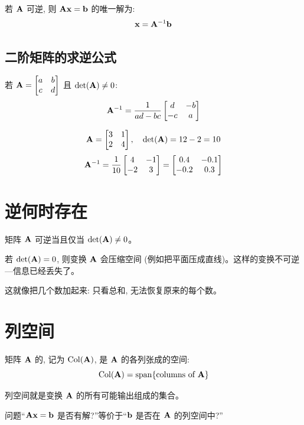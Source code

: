 \begin{theorem}[用逆矩阵解方程组]
若 $\mathbf{A}$ 可逆, 则 $\mathbf{A}\mathbf{x} = \mathbf{b}$ 的唯一解为:
\[
\mathbf{x} = \mathbf{A}^{-1} \mathbf{b}
\]
\end{theorem}

\subsection{二阶矩阵的求逆公式}

\begin{theorem}
若 $\mathbf{A} = \begin{bmatrix} a & b \\ c & d \end{bmatrix}$ 且 $\det(\mathbf{A}) \neq 0$:
\[
\mathbf{A}^{-1} = \frac{1}{ad-bc} \begin{bmatrix} d & -b \\ -c & a \end{bmatrix}
\]
\end{theorem}

\begin{example}
\[
\mathbf{A} = \begin{bmatrix} 3 & 1 \\ 2 & 4 \end{bmatrix}, \quad \det(\mathbf{A}) = 12 - 2 = 10
\]
\[
\mathbf{A}^{-1} = \frac{1}{10} \begin{bmatrix} 4 & -1 \\ -2 & 3 \end{bmatrix} = \begin{bmatrix} 0.4 & -0.1 \\ -0.2 & 0.3 \end{bmatrix}
\]
\end{example}

\section{逆何时存在}

\begin{theorem}
矩阵 $\mathbf{A}$ 可逆当且仅当 $\det(\mathbf{A}) \neq 0$。
\end{theorem}

\begin{intuition}
若 $\det(\mathbf{A}) = 0$, 则变换 $\mathbf{A}$ 会压缩空间 (例如把平面压成直线)。这样的变换不可逆---信息已经丢失了。

这就像把几个数加起来: 只看总和, 无法恢复原来的每个数。
\end{intuition}

\section{列空间}

\begin{definition}[列空间]
矩阵 $\mathbf{A}$ 的, 记为 $\operatorname{Col}(\mathbf{A})$, 是 $\mathbf{A}$ 的各列张成的空间:
\[
\operatorname{Col}(\mathbf{A}) = \operatorname{span}\{\text{columns of } \mathbf{A}\}
\]
\end{definition}

\begin{intuition}
列空间就是变换 $\mathbf{A}$ 的所有可能输出组成的集合。

问题``$\mathbf{A}\mathbf{x} = \mathbf{b}$ 是否有解?''等价于``$\mathbf{b}$ 是否在 $\mathbf{A}$ 的列空间中?''
\end{intuition}

